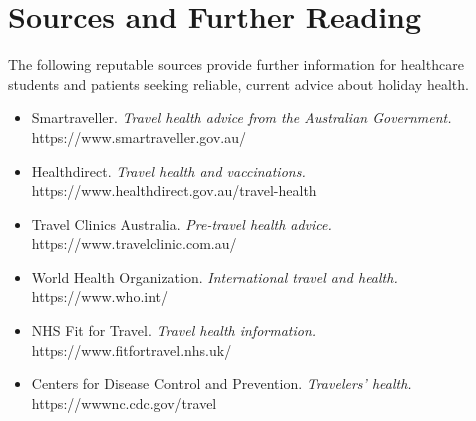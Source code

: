 \section*{Sources and Further Reading}
The following reputable sources provide further information for healthcare students and patients seeking reliable, current advice about holiday health.

\begin{itemize}
    \item Smartraveller. \textit{Travel health advice from the Australian Government.} https://www.smartraveller.gov.au/
    \item Healthdirect. \textit{Travel health and vaccinations.} https://www.healthdirect.gov.au/travel-health
    \item Travel Clinics Australia. \textit{Pre-travel health advice.} https://www.travelclinic.com.au/
    \item World Health Organization. \textit{International travel and health.} https://www.who.int/
    \item NHS Fit for Travel. \textit{Travel health information.} https://www.fitfortravel.nhs.uk/
    \item Centers for Disease Control and Prevention. \textit{Travelers' health.} https://wwwnc.cdc.gov/travel
\end{itemize}
